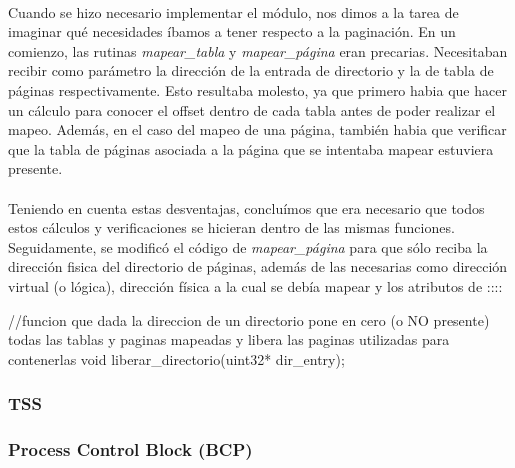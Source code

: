 \documentclass[11pt, a4paper]{article}
\begin{document}
			\paragraph{}
			Cuando se hizo necesario implementar el módulo, nos dimos a la tarea de imaginar qué necesidades íbamos a tener respecto a la paginación. En un comienzo, las rutinas \textit{mapear_tabla} y \textit{mapear_página} eran precarias. Necesitaban recibir como parámetro la dirección de la entrada de directorio y la de tabla de páginas respectivamente. Esto resultaba molesto, ya que primero habia que hacer un cálculo para conocer el offset dentro de cada tabla antes de poder realizar el mapeo. Además, en el caso del mapeo de una página, también habia que verificar que la tabla de páginas asociada a la página que se intentaba mapear estuviera presente.
			
			\paragraph{}
			Teniendo en cuenta estas desventajas, concluímos que era necesario que todos estos cálculos y verificaciones se hicieran dentro de las mismas funciones. Seguidamente, se modificó el código de \textit{mapear_página} para que sólo reciba la dirección fisica del directorio de páginas, además de las necesarias como dirección virtual (o lógica), dirección física a la cual se debía mapear y los atributos de ::::

//funcion que dada la direccion de un directorio pone en cero (o NO presente) todas las tablas y paginas mapeadas y libera las paginas utilizadas para contenerlas
void liberar_directorio(uint32* dir_entry);
		\subsubsection{TSS}
		\subsubsection{Process Control Block (BCP) }
		
\end{document}
